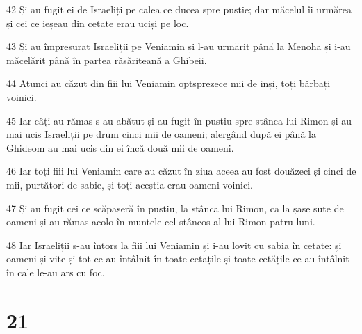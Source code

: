 \par 42 Și au fugit ei de Israeliți pe calea ce ducea spre pustie; dar măcelul îi urmărea și cei ce ieșeau din cetate erau uciși pe loc.
\par 43 Și au împresurat Israeliții pe Veniamin și l-au urmărit până la Menoha și i-au măcelărit până în partea răsăriteană a Ghibeii.
\par 44 Atunci au căzut din fiii lui Veniamin optsprezece mii de inși, toți bărbați voinici.
\par 45 Iar câți au rămas s-au abătut și au fugit în pustiu spre stânca lui Rimon și au mai ucis Israeliții pe drum cinci mii de oameni; alergând după ei până la Ghideom au mai ucis din ei încă două mii de oameni.
\par 46 Iar toți fiii lui Veniamin care au căzut în ziua aceea au fost douăzeci și cinci de mii, purtători de sabie, și toți aceștia erau oameni voinici.
\par 47 Și au fugit cei ce scăpaseră în pustiu, la stânca lui Rimon, ca la șase sute de oameni și au rămas acolo în muntele cel stâncos al lui Rimon patru luni.
\par 48 Iar Israeliții s-au întors la fiii lui Veniamin și i-au lovit cu sabia în cetate: și oameni și vite și tot ce au întâlnit în toate cetățile și toate cetățile ce-au întâlnit în cale le-au ars cu foc.

\chapter{21}

